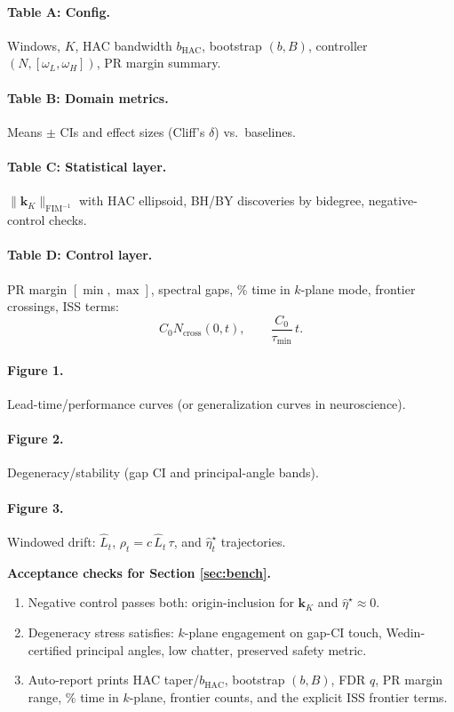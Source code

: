 \documentclass[10pt]{article}
\newcommand{\FIM}{\mathrm{FIM}}
\begin{document}
\paragraph{Table A: Config.} Windows, $K$, HAC bandwidth $b_{\mathrm{HAC}}$, bootstrap $(b,B)$, controller $(N,[\omega_L,\omega_H])$, PR margin summary.

\paragraph{Table B: Domain metrics.} Means $\pm$ CIs and effect sizes (Cliff’s $\delta$) vs.\ baselines.

\paragraph{Table C: Statistical layer.} $\|\widehat{\mathbf k}_K\|_{\FIM^{-1}}$ with HAC ellipsoid, BH/BY discoveries by bidegree, negative-control checks.

\paragraph{Table D: Control layer.} PR margin \([ \min,\max]\), spectral gaps, \% time in $k$-plane mode, frontier crossings, ISS terms:
\[
C_0 N_{\mathrm{cross}}(0,t),\qquad \frac{C_0}{\tau_{\min}}\,t.
\]

\paragraph{Figure 1.} Lead-time/performance curves (or generalization curves in neuroscience).  
\paragraph{Figure 2.} Degeneracy/stability (gap CI and principal-angle bands).  
\paragraph{Figure 3.} Windowed drift: $\widehat L_t$, $\rho_t=c\,\widehat L_t\,\tau$, and $\widehat\eta^\star_t$ trajectories.

\begin{mdframed}
\textbf{Acceptance checks for Section \ref{sec:bench}.}
\begin{enumerate}[leftmargin=*]
\item Negative control passes both: origin-inclusion for $\mathbf k_K$ and $\widehat\eta^\star\approx 0$.
\item Degeneracy stress satisfies: $k$-plane engagement on gap-CI touch, Wedin-certified principal angles, low chatter, preserved safety metric.
\item Auto-report prints HAC taper/$b_{\mathrm{HAC}}$, bootstrap $(b,B)$, FDR $q$, PR margin range, \% time in $k$-plane, frontier counts, and the explicit ISS frontier terms.
\end{enumerate}
\end{mdframed}
\end{document}
